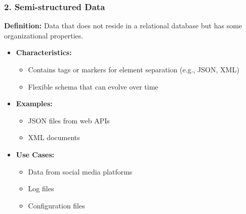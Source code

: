 \documentclass[aspectratio=169]{beamer}
\begin{document}
\begin{frame}[fragile]
  \frametitle{2. Semi-structured Data}
  \textbf{Definition:} Data that does not reside in a relational database but has some organizational properties.

  \begin{itemize}
    \item \textbf{Characteristics:}
      \begin{itemize}
        \item Contains tags or markers for element separation (e.g., JSON, XML)
        \item Flexible schema that can evolve over time
      \end{itemize}
    
    \item \textbf{Examples:}
      \begin{itemize}
        \item JSON files from web APIs
        \item XML documents
      \end{itemize}
    
    \item \textbf{Use Cases:}
      \begin{itemize}
        \item Data from social media platforms
        \item Log files
        \item Configuration files
      \end{itemize}
  \end{itemize}
\end{frame}
\end{document}
